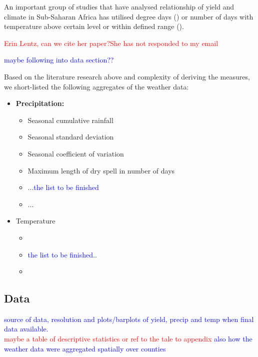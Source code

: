 \documentclass[a4paper,12pt]{article}
\begin{document}
An important group of studies that have analysed relationship of yield and climate in Sub-Saharan Africa has utilised degree days (\citealt{SchulzeEtA1993,TingemEtAl2008,WalkerSchulze2008,TingemEtAl2009}) or number of days with temperature above certain level or within defined range (\citealt{Giannakopoulos2009,LauxEtAl}).


\textcolor{red}{Erin Lentz, can we cite her paper?She has not responded to my email}

\textcolor{blue}{maybe following into data section??}

Based on the literature research above and complexity of deriving the measures, we short-listed the following aggregates of the weather data:



\begin{itemize}

\item \textbf{Precipitation:}

\begin{itemize}
\item Seasonal cumulative rainfall
\item Seasonal standard deviation 
\item Seasonal coefficient of variation 
\item Maximum length of dry spell in number of days
\item ...\textcolor{blue}{the list to be finished}
\item...
\end{itemize}
\item Temperature
\begin{itemize}
\item
\item\textcolor{blue}{the list to be finished}..
\item
\end{itemize}
\end{itemize}
\subsection{Data}
\textcolor{blue}{source of data, resolution and plots/barplots of yield, precip and temp when final data available.}\\
\textcolor{red}{maybe a table of descriptive statistics or ref to the tale to appendix}
\textcolor{blue}{also how the weather data were aggregated spatially over counties}
\end{document}

